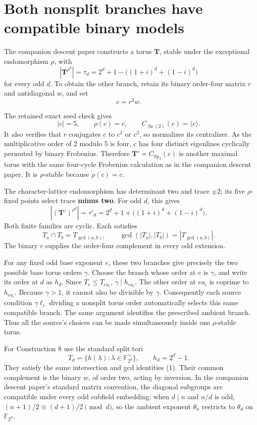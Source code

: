 \documentclass[11pt,a4paper]{article}
\begin{document}
\section{Both nonsplit branches have compatible binary
models}\label{both-nonsplit-branches-have-compatible-binary-models}

The companion descent paper constructs a torus \(\mathbf T\), stable
under the exceptional endomorphism \(\rho\), with \[
|\mathbf T^{\rho^d}|=\tau_d
=2^d+1-\big((1+i)^d+(1-i)^d\big)
\] for every odd \(d\). To obtain the other branch, retain its binary
order-four matrix \(r\) and antidiagonal \(w\), and set \[
c=r^2w.
\]

The retained exact seed check gives \[
|c|=5,\qquad \rho(c)=c,\qquad
C_{\operatorname{Sz}(2)}(c)=\langle c\rangle.
\] It also verifies that \(r\) conjugates \(c\) to \(c^2\) or \(c^3\),
so normalizes its centralizer. As the multiplicative order of 2 modulo 5
is four, \(c\) has four distinct eigenlines cyclically permuted by
binary Frobenius. Therefore \(\mathbf T'=C_{\operatorname{Sp}_4}(c)\) is
another maximal torus with the same four-cycle Frobenius calculation as
in the companion descent paper. It is \(\rho\)-stable because
\(\rho(c)=c\).

The character-lattice endomorphism has determinant two and trace
\(\pm2\); its five \(\rho\)-fixed points select trace \textbf{minus
two}. For odd \(d\), this gives \[
|(\mathbf T')^{\rho^d}|=\tau'_d
=2^d+1+\big((1+i)^d+(1-i)^d\big).
\] Both finite families are cyclic. Each satisfies \[
T_a\cap T_b=T_{\gcd(a,b)},\qquad
\gcd(|T_a|,|T_b|)=|T_{\gcd(a,b)}|.
\tag{1}
\] The binary \(r\) supplies the order-four complement in every odd
extension.

For any fixed odd base exponent \(e\), these two branches give precisely
the two possible base torus orders \(\gamma\). Choose the branch whose
order at \(e\) is \(\gamma\), and write its order at \(d\) as \(h_d\).
Since \(T_e\le T_{ea_i}\), \(\gamma\mid h_{ea_i}\). The other order at
\(ea_i\) is coprime to \(h_{ea_i}\). Because \(\gamma>1\), it cannot
also be divisible by \(\gamma\). Consequently each source condition
\(\gamma\ell_i\) dividing a nonsplit torus order automatically selects
this same compatible branch. The same argument identifies the prescribed
ambient branch. Thus all the source's choices can be made simultaneously
inside one \(\rho\)-stable torus.

For Construction 8 use the standard split tori \[
T_d=\{h(\lambda):\lambda\in\mathbb F_{2^d}^{\times}\},
\qquad h_d=2^d-1.
\] They satisfy the same intersection and gcd identities (1). Their
common complement is the binary \(w\), of order two, acting by
inversion. In the companion descent paper's standard matrix convention,
the diagonal subgroups are compatible under every odd subfield
embedding: when \(d\mid n\) and \(n/d\) is odd,
\((n+1)/2\equiv(d+1)/2\pmod d\), so the ambient exponent \(\theta_n\)
restricts to \(\theta_d\) on \(\mathbb F_{2^d}\).
\end{document}
